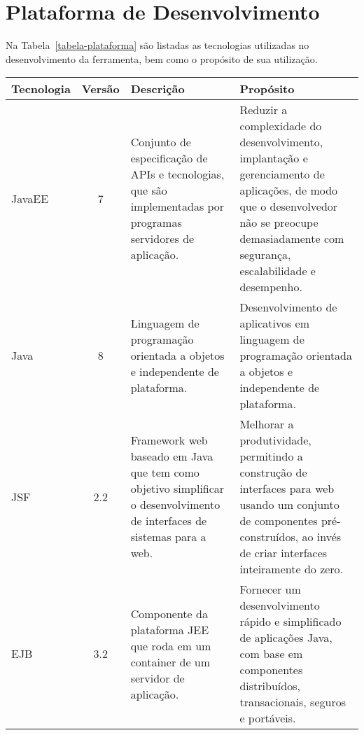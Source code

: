 \chapter{ Plataforma de Desenvolvimento}
\label{sec-plataforma}




Na Tabela~\ref{tabela-plataforma} são listadas as tecnologias utilizadas no desenvolvimento da ferramenta, bem como o propósito de sua utilização.

\begin{table}[h]
	\centering	
	\vspace{0.5cm}
	\footnotesize
	\begin{tabular}{|p{1.6cm}|c|p{5cm}|p{6.5cm}|}  \hline \rowcolor[rgb]{0.8,0.8,0.8}
	
 		Tecnologia & Versão & Descrição & Propósito \\\hline 
 		                             
		JavaEE & 7 & Conjunto de especificação de APIs e tecnologias, que são implementadas por programas servidores de aplicação. & Reduzir a complexidade do desenvolvimento, implantação e gerenciamento de aplicações, de modo que o desenvolvedor não se preocupe demasiadamente com segurança, escalabilidade e desempenho. \\ \hline
	
		Java & 8 & Linguagem de programação orientada a objetos e independente de plataforma. & Desenvolvimento de aplicativos em linguagem de programação orientada a objetos e independente de plataforma. \\\hline
		
		JSF & 2.2 & Framework web baseado em Java que tem como objetivo simplificar o desenvolvimento de interfaces de sistemas para a web. & Melhorar a produtividade, permitindo a construção de interfaces para web usando um conjunto de componentes pré-construídos, ao invés de criar interfaces inteiramente do zero.  \\\hline  
		 
		EJB & 3.2 & Componente da  plataforma JEE  que roda em um container de um servidor de aplicação.   &  Fornecer um desenvolvimento rápido e simplificado de aplicações Java, com base em componentes distribuídos, transacionais, seguros e portáveis.  \\\hline
		 

\end{tabular}
\end{table}
